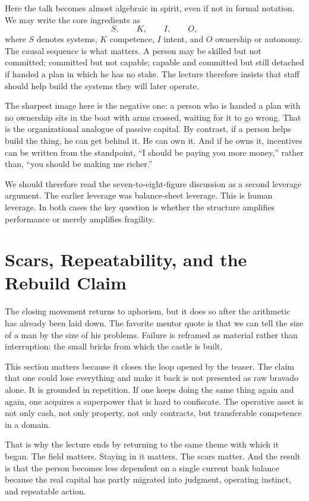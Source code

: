 Here the talk becomes almost algebraic in spirit, even if not in formal notation. We may write the core ingredients as
\[
S, \qquad K, \qquad I, \qquad O,
\]
where \(S\) denotes systems, \(K\) competence, \(I\) intent, and \(O\) ownership or autonomy. The causal sequence is what matters. A person may be skilled but not committed; committed but not capable; capable and committed but still detached if handed a plan in which he has no stake. The lecture therefore insists that staff should help build the systems they will later operate.

The sharpest image here is the negative one: a person who is handed a plan with no ownership sits in the boat with arms crossed, waiting for it to go wrong. That is the organizational analogue of passive capital. By contrast, if a person helps build the thing, he can get behind it. He can own it. And if he owns it, incentives can be written from the standpoint, ``I should be paying you more money,'' rather than, ``you should be making me richer.''

We should therefore read the seven-to-eight-figure discussion as a second leverage argument. The earlier leverage was balance-sheet leverage. This is human leverage. In both cases the key question is whether the structure amplifies performance or merely amplifies fragility.

\section{Scars, Repeatability, and the Rebuild Claim}

The closing movement returns to aphorism, but it does so after the arithmetic has already been laid down. The favorite mentor quote is that we can tell the size of a man by the size of his problems. Failure is reframed as material rather than interruption: the small bricks from which the castle is built.

This section matters because it closes the loop opened by the teaser. The claim that one could lose everything and make it back is not presented as raw bravado alone. It is grounded in repetition. If one keeps doing the same thing again and again, one acquires a superpower that is hard to confiscate. The operative asset is not only cash, not only property, not only contracts, but transferable competence in a domain.

That is why the lecture ends by returning to the same theme with which it began. The field matters. Staying in it matters. The scars matter. And the result is that the person becomes less dependent on a single current bank balance because the real capital has partly migrated into judgment, operating instinct, and repeatable action.

